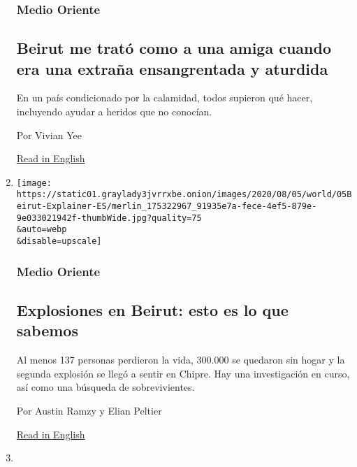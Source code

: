 \begin{enumerate}
  \hypertarget{medio-oriente}{%
  \subsubsection{Medio Oriente}\label{medio-oriente}}

  \hypertarget{beirut-me-tratuxf3-como-a-una-amiga-cuando-era-una-extrauxf1a-ensangrentada-y-aturdida}{%
  \subsection{Beirut me trató como a una amiga cuando era una extraña
  ensangrentada y
  aturdida}\label{beirut-me-tratuxf3-como-a-una-amiga-cuando-era-una-extrauxf1a-ensangrentada-y-aturdida}}

  En un país condicionado por la calamidad, todos supieron qué hacer,
  incluyendo ayudar a heridos que no conocían.

  Por Vivian Yee

  \href{https://www.nytimes3xbfgragh.onion/2020/08/04/world/middleeast/lebanon-explosion-beirut.html}{Read
  in English}
\item
  \href{/es/2020/08/05/espanol/mundo/explosion-beirut-que-paso.html}{}

  \texttt{[image: https://static01.graylady3jvrrxbe.onion/images/2020/08/05/world/05Beirut-Explainer-ES/merlin\_175322967\_91935e7a-fece-4ef5-879e-9e033021942f-thumbWide.jpg?quality=75\\\&auto=webp\\\&disable=upscale]}

  \hypertarget{medio-oriente-1}{%
  \subsubsection{Medio Oriente}\label{medio-oriente-1}}

  \hypertarget{explosiones-en-beirut-esto-es-lo-que-sabemos}{%
  \subsection{Explosiones en Beirut: esto es lo que
  sabemos}\label{explosiones-en-beirut-esto-es-lo-que-sabemos}}

  Al menos 137 personas perdieron la vida, 300.000 se quedaron sin hogar
  y la segunda explosión se llegó a sentir en Chipre. Hay una
  investigación en curso, así como una búsqueda de sobrevivientes.

  Por Austin Ramzy y Elian Peltier

  \href{https://www.nytimes3xbfgragh.onion/2020/08/05/world/middleeast/beirut-explosion-what-happened.html}{Read
  in English}
\item
  \href{/es/2020/08/05/espanol/mundo/italia-reapertura-coronavirus.html}{}


\end{enumerate}
